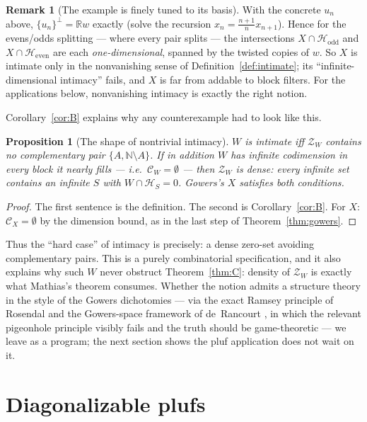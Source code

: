 \documentclass[11pt,reqno]{amsart}
\newtheorem{proposition}[theorem]{Proposition}
\theoremstyle{definition}
\newtheorem{remark}[theorem]{Remark}
\newcommand{\HH}{\mathcal{H}}
\newcommand{\N}{\mathbb{N}}
\newcommand{\R}{\mathbb{R}}
\newcommand{\ZW}{\mathcal{Z}}
\begin{document}
\begin{remark}[The example is finely tuned to its basis]\label{rem:tuned}
With the concrete $u_n$ above, $\{u_n\}^\perp=\R w$ exactly (solve the recursion
$x_n=\tfrac{n+1}{n}x_{n+1}$). Hence for the evens/odds splitting --- where every pair
splits --- the intersections $X\cap\HH_{\mathrm{odd}}$ and $X\cap\HH_{\mathrm{even}}$
are each \emph{one-dimensional}, spanned by the twisted copies of $w$. So $X$ is
intimate only in the nonvanishing sense of Definition~\ref{def:intimate}; its
``infinite-dimensional intimacy'' fails, and $X$ is far from addable to block filters.
For the applications below, nonvanishing intimacy is exactly the right notion.
\end{remark}

Corollary~\ref{cor:B} explains why any counterexample had to look like this.

\begin{proposition}[The shape of nontrivial intimacy]\label{prop:shape}
$W$ is intimate iff $\ZW_W$ contains no complementary pair $\{A,\N\setminus A\}$. If in
addition $W$ has infinite codimension in every block it nearly fills --- i.e.\
$\mathcal C_W=\emptyset$ --- then $\ZW_W$ is dense: every infinite set contains an
infinite $S$ with $W\cap\HH_S=0$. Gowers's $X$ satisfies both conditions.
\end{proposition}

\begin{proof}
The first sentence is the definition. The second is Corollary~\ref{cor:B}. For $X$:
$\mathcal C_X=\emptyset$ by the dimension bound, as in the last step of
Theorem~\ref{thm:gowers}.
\end{proof}

Thus the ``hard case'' of intimacy is precisely: a dense zero-set avoiding complementary
pairs. This is a purely combinatorial specification, and it also explains why such $W$
never obstruct Theorem~\ref{thm:C}: density of $\ZW_W$ is exactly what Mathias's theorem
consumes. Whether the notion admits a structure theory in the style of the Gowers
dichotomies --- via the exact Ramsey principle of Rosendal \cite{Rosendal} and the
Gowers-space framework of de~Rancourt \cite{deRancourt}, in which the relevant pigeonhole
principle visibly fails and the truth should be game-theoretic --- we leave as a program;
the next section shows the pluf application does not wait on it.

\section{Diagonalizable plufs}\label{sec:diag}
\end{document}
